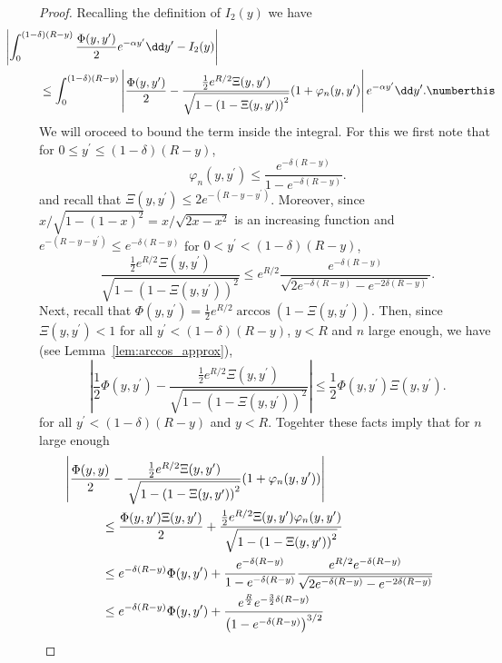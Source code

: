 \begin{proof}
Recalling the definition of $I_2(y)$ we have
\begin{align*}
	&\hspace{-30pt}\left|\int_0^{(1-\delta)(R- y)} \frac{\Phi(y,y^\prime)}{2} e^{-\alpha y^\prime} \dd y^\prime 
		- I_2(y)\right|\\
	&\le \int_0^{(1-\delta)(R- y)} \left|\frac{\Phi(y,y^\prime)}{2}- \frac{\frac{1}{2}e^{R/2} \Xi(y,y^\prime)}
		{\sqrt{1 - \left(1 - \Xi(y,y^\prime)\right)^2}}(1+\varphi_n(y,y^\prime)\right|e^{-\alpha y^\prime} \dd y^\prime.
		\numberthis \label{eq:derivative_hyp_ball_final_error}
\end{align*}
We will oroceed to bound the term inside the integral. For this we first note that for $0 \le y^\prime \le (1-\delta)(R-y)$,
\[
	\varphi_n(y,y^\prime) \le \frac{e^{-\delta(R-y)}}{1 - e^{-\delta(R-y)}}.
\]
and recall that $\Xi(y,y^\prime) \le 2 e^{-(R-y-y^\prime)}$. Moreover, since $x/\sqrt{1-(1-x)^2} = x/\sqrt{2x-x^2}$ is an increasing function and $e^{-(R - y - y^\prime)} \le e^{-\delta(R- y)}$ for $0 < y^\prime < (1-\delta)(R-y)$,
\[
	\frac{\frac{1}{2}e^{R/2} \Xi(y,y^\prime)}{\sqrt{1 - \left(1 - \Xi(y,y^\prime)\right)^2}}
	\le e^{R/2} \frac{e^{-\delta(R-y)}}{\sqrt{2e^{-\delta(R-y)} - e^{-2\delta(R-y)}}}.
\]
Next, recall that $\Phi(y,y^\prime) = \frac{1}{2}e^{R/2}\arccos(1-\Xi(y,y^\prime))$. Then, since $\Xi(y,y^\prime) < 1$ for all $y^\prime < (1-\delta)(R-y)$, $y < R$ and $n$ large enough, we have (see Lemma~\ref{lem:arccos_approx}),
\[
	\left|\frac{1}{2}\Phi(y,y^\prime) - \frac{\frac{1}{2}e^{R/2} \Xi(y,y^\prime)}{\sqrt{1 - \left(1 - \Xi(y,y^\prime)\right)^2}}\right| \le \frac{1}{2}\Phi(y,y^\prime) \Xi(y,y^\prime).
\]
for all $y^\prime < (1-\delta)(R - y)$ and $y < R$. Togehter these facts imply that for $n$ large enough
\begin{align*}
	&\hspace{-30pt}\left|\frac{\Phi(y,y)}{2} - \frac{\frac{1}{2}e^{R/2} \Xi(y,y^\prime)}{\sqrt{1 - \left(1 - 	
		\Xi(y,y^\prime)\right)^2}}(1+\varphi_n(y,y^\prime))\right|\\
	&\le \frac{\Phi(y,y^\prime)\Xi(y,y^\prime)}{2} 
		+ \frac{\frac{1}{2}e^{R/2} \Xi(y,y^\prime) \varphi_n(y,y^\prime)}
		{\sqrt{1 - \left(1 - \Xi(y,y^\prime)\right)^2}} \\
	&\le e^{-\delta(R-y)} \Phi(y,y^\prime) + \frac{e^{-\delta(R-y)}}{1-e^{-\delta(R-y)}}
		\frac{e^{R/2} e^{-\delta(R-y)}}{\sqrt{2e^{-\delta(R-y)} - e^{-2\delta(R-y)}}}\\
	&\le e^{-\delta(R-y)} \Phi(y,y^\prime) + \frac{e^{\frac{R}{2}}e^{-\frac{3}{2}\delta(R-y)}}
		{\left(1 - e^{-\delta(R-y)}\right)^{3/2}}
\end{align*}


\end{proof}

